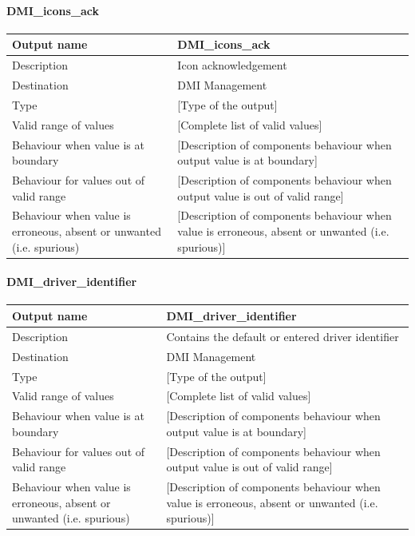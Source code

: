 \paragraph{DMI\_icons\_ack}

\begin{longtable}{p{}p{}}
\toprule
Output name				& DMI\_icons\_ack \\
\midrule
Description				& Icon acknowledgement \\
\midrule
Destination				& DMI Management \\ 
\midrule
Type					& [Type of the output] \\
\midrule
Valid range of values	& [Complete list of valid values] \\
\midrule
Behaviour when value is at boundary	& [Description of components behaviour when output value is at boundary] \\
\midrule
Behaviour for values out of valid range	& [Description of components behaviour when output value is out of valid range] \\
\midrule
Behaviour when value is erroneous, absent or unwanted (i.e. spurious) & [Description of components behaviour when value is erroneous, absent or unwanted (i.e. spurious)] \\
\bottomrule
\end{longtable}


\paragraph{DMI\_driver\_identifier}

\begin{longtable}{p{}p{}}
\toprule
Output name				& DMI\_driver\_identifier \\
\midrule
Description				&  Contains the default or entered driver identifier \\
\midrule
Destination				& DMI Management \\ 
\midrule
Type					& [Type of the output] \\
\midrule
Valid range of values	& [Complete list of valid values] \\
\midrule
Behaviour when value is at boundary	& [Description of components behaviour when output value is at boundary] \\
\midrule
Behaviour for values out of valid range	& [Description of components behaviour when output value is out of valid range] \\
\midrule
Behaviour when value is erroneous, absent or unwanted (i.e. spurious) & [Description of components behaviour when value is erroneous, absent or unwanted (i.e. spurious)] \\
\bottomrule
\end{longtable}

